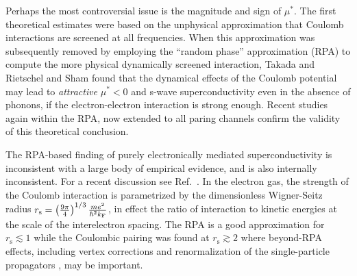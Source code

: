 \documentclass[%
 reprint,
superscriptaddress,
 amsmath,amssymb,
 aps,
prx,
]{revtex4-2}
\newcommand{\txs}{\text{s}}
\begin{document}
Perhaps the most controversial issue is the magnitude and sign of $\mu^*$.  The first theoretical estimates were based on the unphysical approximation that Coulomb interactions are screened at all frequencies. When this approximation was subsequently  removed by employing the ``random phase'' approximation (RPA) to compute the more physical dynamically screened interaction, Takada \cite{takada1978plasmon, takada1993} and Rietschel and Sham \cite{rietschel} found that the dynamical effects of the Coulomb potential may lead to \textit{attractive} $\mu^* < 0$ and s-wave superconductivity even in the absence of phonons, if the electron-electron interaction is strong enough. Recent studies again within the RPA, now extended to all paring channels \cite{23tao, xiansheng, pengcheng} confirm the validity of this theoretical conclusion. 

The RPA-based finding of purely electronically mediated superconductivity is inconsistent with a large body of empirical evidence, and is also internally inconsistent. For a recent discussion see Ref.~\cite{dassarma2025}.  In the electron gas, the strength of the Coulomb interaction is parametrized by the dimensionless Wigner-Seitz radius $r_\txs=\left(\frac{9\pi}{4}\right)^{1/3} \frac{m e^2}{\hbar^2 k_{\text F}}$, in effect the ratio of interaction to kinetic energies at the scale of the interelectron spacing. The RPA is a good approximation for $r_\txs \lesssim 1$ while the Coulombic pairing was found at $r_\txs\gtrsim 2$ where beyond-RPA effects, including vertex corrections and renormalization of the single-particle propagators \cite{RPA_mu2, 23tao}, may be important. 
\end{document}
